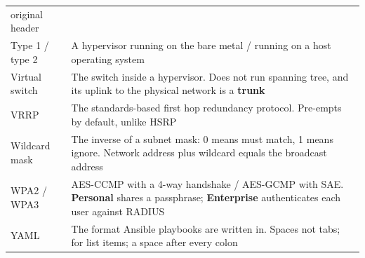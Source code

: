\begin{longtable}{@{}L{4.0cm}L{11.6cm}@{}}
original header \\
Type 1 / type 2 & A hypervisor running on the bare metal / running on a host
operating system \\
Virtual switch & The switch inside a hypervisor. Does not run spanning tree, and
its uplink to the physical network is a \textbf{trunk} \\
VRRP & The standards-based first hop redundancy protocol. Pre-empts by default,
unlike HSRP \\
Wildcard mask & The inverse of a subnet mask: 0 means must match, 1 means ignore.
Network address plus wildcard equals the broadcast address \\
WPA2 / WPA3 & AES-CCMP with a 4-way handshake / AES-GCMP with SAE.
\textbf{Personal} shares a passphrase; \textbf{Enterprise} authenticates each
user against RADIUS \\
YAML & The format Ansible playbooks are written in. Spaces not tabs; \cmd{-} for
list items; a space after every colon \\
\bottomrule
\end{longtable}
